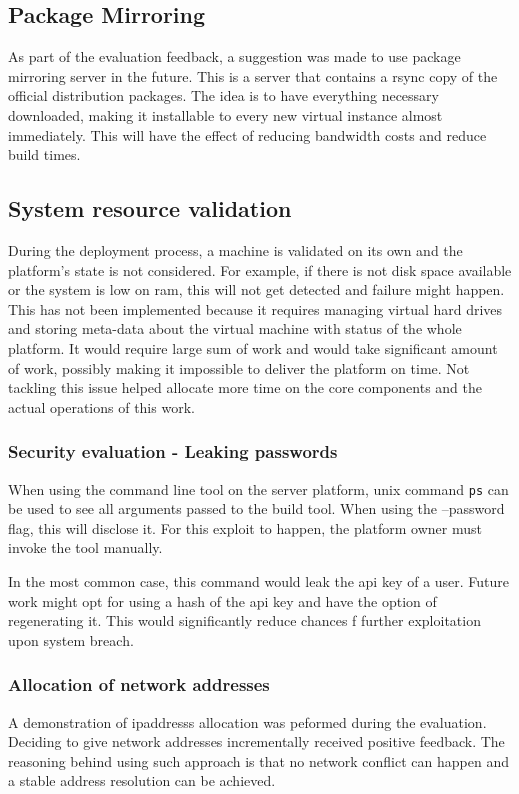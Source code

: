 \documentclass{article}
\begin{document}
\subsection{Package Mirroring}
As part of the evaluation feedback, a suggestion was made to use package mirroring server in the future. This is a server that contains a \gls{rsync} copy of the official distribution packages. The idea is to have everything necessary downloaded, making it installable to every new virtual instance almost immediately. This will have the effect of reducing bandwidth costs and reduce build times.

\subsection{System resource validation}
During the deployment process, a machine is validated on its own and the platform's state is not considered. For example, if there is not disk space available or the system is low on \gls{ram}, this will not get detected and failure might happen. This has not been implemented because it requires managing virtual hard drives and storing meta-data about the virtual machine with status of the whole platform. It would require large sum of work and would take significant amount of work, possibly making it impossible to deliver the platform on time.
Not tackling this issue helped allocate more time on the core components and the actual operations of this work.

\subsubsection{Security evaluation - Leaking passwords}
When using the command line tool on the server platform, \gls{unix} command \texttt{ps} can be used to see all arguments passed to the build tool. When using the --password flag, this will disclose it.
For this exploit to happen, the platform owner must invoke the tool manually.

In the most common case, this command would leak the \gls{api} key of a user. Future work might opt for using a hash of the \gls{api} key and have the option of regenerating it. This would significantly reduce chances f further exploitation upon system breach.

\subsubsection{Allocation of network addresses}
A demonstration of \glspl{ipaddress} allocation was peformed during the evaluation. Deciding to give network addresses incrementally received positive feedback. The reasoning behind using such approach is that no network conflict can happen and a stable address resolution can be achieved.
\end{document}
